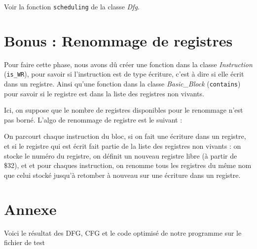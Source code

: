 \documentclass[a4paper, 11pt, notitlepage]{article}
\begin{document}
Voir la fonction \verb |scheduling| de la classe \emph{Dfg}.

\section{Bonus : Renommage de registres}
Pour faire cette phase, nous avons dû créer une fonction dans la classe \emph{Instruction} (\verb |is_WR|), pour savoir si l'instruction est de type écriture, c'est à dire si elle écrit dans un registre.
Ainsi qu'une fonction dans la classe \emph{Basic\_Block} (\verb |contains|) pour savoir si le registre est dans la liste des registres non vivants.

Ici, on suppose que le nombre de registres disponibles pour le renommage n'est pas borné.
L'algo de renommage de registre est le suivant :

On parcourt chaque instruction du bloc, si on fait une écriture dans un registre, et si le registre qui est écrit fait partie de la liste des registres non vivants :
on stocke le numéro du registre, on définit un nouveau registre libre (à partir de \$32), et et pour chaques instruction, on renomme tous les registres du même nom que celui stocké jusqu'à retomber à nouveau sur une écriture dans un registre.
\newpage
\section*{Annexe}

Voici le résultat des DFG, CFG et le code optimisé de notre programme sur le fichier de test 
\end{document}
